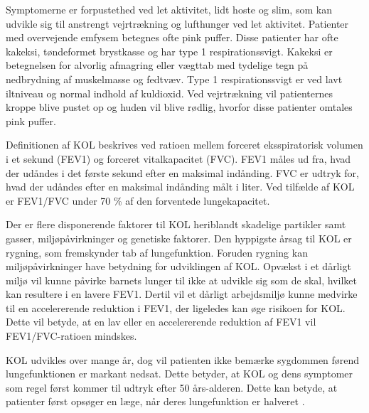  
\noindent
Symptomerne er forpustethed ved let aktivitet, lidt hoste og slim, som kan udvikle sig til anstrengt vejrtrækning og lufthunger ved let aktivitet. Patienter med overvejende emfysem betegnes ofte pink puffer. Disse patienter har ofte kakeksi, tøndeformet brystkasse og har type 1 respirationssvigt. Kakeksi er betegnelsen for alvorlig afmagring eller vægttab med tydelige tegn på nedbrydning af muskelmasse og fedtvæv. Type 1 respirationssvigt er ved lavt iltniveau og normal indhold af kuldioxid. Ved vejrtrækning vil patienternes kroppe blive pustet op og huden vil blive rødlig, hvorfor disse patienter omtales pink puffer.\cite{Healthguidances2016}

Definitionen af KOL beskrives ved ratioen mellem forceret eksspiratorisk volumen i et sekund (FEV1) og forceret vitalkapacitet (FVC). FEV1 måles ud fra, hvad der udåndes i det første sekund efter en maksimal indånding. FVC er udtryk for, hvad der udåndes efter en maksimal indånding målt i liter. Ved tilfælde af KOL er FEV1/FVC under 70 \% af den forventede lungekapacitet. \cite{Basisbogen2016}

Der er flere disponerende faktorer til KOL heriblandt skadelige partikler samt gasser, miljøpåvirkninger og genetiske faktorer. Den hyppigste årsag til KOL er rygning, som fremskynder tab af lungefunktion.\cite{Basisbogen2016,Martinez2016,dsam2016} Foruden rygning kan miljøpåvirkninger have betydning for udviklingen af KOL. Opvækst i et dårligt miljø vil kunne påvirke barnets lunger til ikke at udvikle sig som de skal, hvilket kan resultere i en lavere FEV1. Dertil vil et dårligt arbejdsmiljø kunne medvirke til en accelererende reduktion i FEV1, der ligeledes kan øge risikoen for KOL. \cite{Martinez2016} Dette vil betyde, at en lav eller en accelererende reduktion af FEV1 vil FEV1/FVC-ratioen mindskes. 

KOL udvikles over mange år, dog vil patienten ikke bemærke sygdommen førend lungefunktionen er markant nedsat. Dette betyder, at KOL og dens symptomer som regel først kommer til udtryk efter 50 års-alderen\cite{Lange2015}. Dette kan betyde, at patienter først opsøger en læge, når deres lungefunktion er halveret \cite{dsam2016}. 



